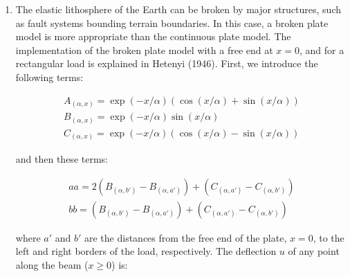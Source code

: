\documentclass[a4paper , 12pt]{book}
\newcommand{\code}[1]{\colorbox{light-gray}{\texttt{#1}}}
\begin{document}
\begin{enumerate}
    Write a function that plots the tangential stress as function of $\theta$, on the surface of an elliptical hole under far field stresses, $\sigma_1$ and $\sigma_3$. Check your function with the three cases in Figure 8.6 of Jaeger et al. (2007). \textit{Hint}: Start with function {\code{hoop}}, and modify the \code{geom} and \code{stress} entries to fit this new problem. You will need to implement Eq. 9.32 for the tangential stress. You can use values of $\theta$ from 0 to 180\degree and 1\degree increment. 
    
    \item The elastic lithosphere of the Earth can be broken by major structures, such as fault systems bounding terrain boundaries. In this case, a broken plate model is more appropriate than the continuous plate model. The implementation of the broken plate model with a free end at $x=0$, and for a rectangular load is explained in Hetenyi (1946). First, we introduce the following terms:
    
    \begin{equation}
        \begin{gathered}
            A_{(\alpha,x)} = \exp(-x/\alpha)(\cos(x/\alpha) + \sin(x/\alpha)) \\ B_{(\alpha,x)} = \exp(-x/\alpha)\sin(x/\alpha) \\ 
            C_{(\alpha,x)} = \exp(-x/\alpha)(\cos(x/\alpha) - \sin(x/\alpha))
        \end{gathered}
    \end{equation}
    
    and then these terms:
    
    \begin{equation}
        \begin{gathered}
            aa = 2(B_{(\alpha,b')} - B_{(\alpha,a')}) + (C_{(\alpha,a')} - C_{(\alpha,b')}) \\ 
            bb = (B_{(\alpha,b')} - B_{(\alpha,a')}) + (C_{(\alpha,a')} - C_{(\alpha,b')})
        \end{gathered}
    \end{equation}
    
    where $a'$ and $b'$ are the distances from the free end of the plate, $x=0$, to the left and right borders of the load, respectively. The deflection $u$ of any point along the beam ($x\geq 0$) is:


\end{enumerate}
\end{document}
